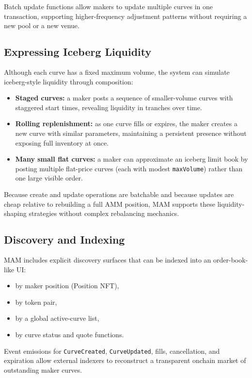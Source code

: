 \documentclass[version=preprint]{iacrcc}
\begin{document}
Batch update functions allow makers to update multiple curves in one transaction, supporting higher-frequency adjustment patterns without requiring a new pool or a new venue.

\subsection{Expressing Iceberg Liquidity}

Although each curve has a fixed maximum volume, the system can simulate iceberg-style liquidity through composition:
\begin{itemize}
  \item \textbf{Staged curves:} a maker posts a sequence of smaller-volume curves with staggered start times, revealing liquidity in tranches over time.
  \item \textbf{Rolling replenishment:} as one curve fills or expires, the maker creates a new curve with similar parameters, maintaining a persistent presence without exposing full inventory at once.
  \item \textbf{Many small flat curves:} a maker can approximate an iceberg limit book by posting multiple flat-price curves (each with modest \texttt{maxVolume}) rather than one large visible order.
\end{itemize}

Because create and update operations are batchable and because updates are cheap relative to rebuilding a full AMM position, MAM supports these liquidity-shaping strategies without complex rebalancing mechanics.

\subsection{Discovery and Indexing}

MAM includes explicit discovery surfaces that can be indexed into an order-book-like UI:
\begin{itemize}
  \item by maker position (Position NFT),
  \item by token pair,
  \item by a global active-curve list,
  \item by curve status and quote functions.
\end{itemize}

Event emissions for \texttt{CurveCreated}, \texttt{CurveUpdated}, fills, cancellation, and expiration allow external indexers to reconstruct a transparent onchain market of outstanding maker curves.
\end{document}
